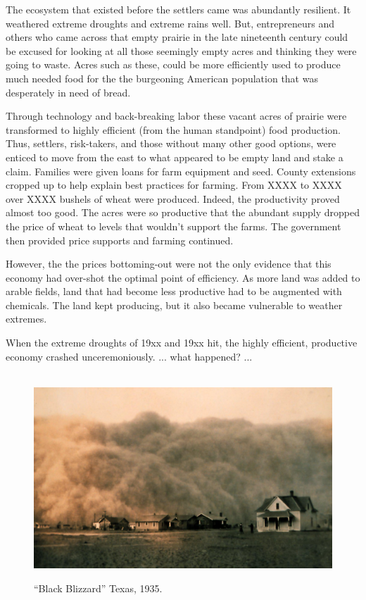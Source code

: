 \documentclass{article}
\begin{document}
The ecosystem that existed before the settlers came was abundantly
resilient. It weathered extreme droughts and extreme rains well.
But, entrepreneurs and others who came across that
empty prairie in the late nineteenth century could be excused for 
looking at all those seemingly empty acres and thinking they were
going to waste.  Acres such as these, could be
more efficiently used to produce much needed food for the 
the burgeoning American population that was desperately
 in need of bread.
 



Through technology and back-breaking labor
these vacant acres of prairie were transformed
to highly efficient (from the human standpoint) food
production. Thus, settlers, risk-takers, and those without many other
good options, were enticed to move from the east to
what appeared to be empty land and stake a claim. Families
were given loans for farm equipment and seed. County
extensions cropped up to help explain best practices for farming.
From XXXX to XXXX over XXXX bushels of wheat were produced.
Indeed, the productivity proved almost too good. 
The acres were so productive
that the abundant supply dropped the price of wheat to
levels that wouldn't support the farms.  
The government then
provided price supports and farming continued.

However, the the prices bottoming-out were not the only
evidence that this economy had over-shot the 
optimal point of efficiency. As more land was added to arable
fields, land that had become less productive had to be
augmented with chemicals.
The land kept producing, but it also became vulnerable to 
weather extremes. 

When the extreme droughts of 19xx and 19xx hit, the highly efficient, 
productive economy
crashed unceremoniously. ... what happened?   ...

\begin{figure}
\centering\
\includegraphics[width=.9\linewidth]{Dust-storm-Texas-1935.png}
\caption{``Black Blizzard'' Texas, 1935.}
\label{fig:ulano_ex}
\end{figure}
\end{document}

